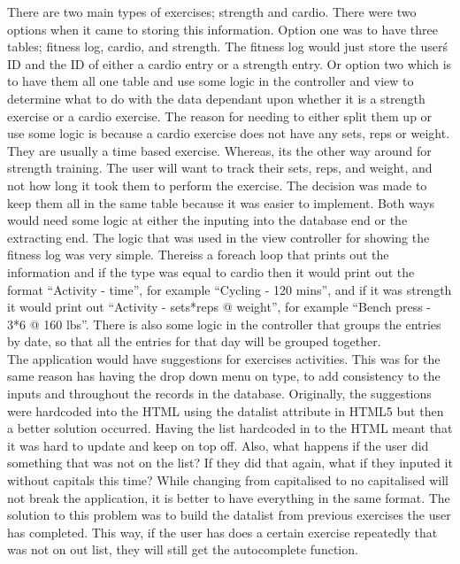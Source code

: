 There are two main types of exercises; strength and cardio. There were two options when it came to storing this information. Option one was to have three tables; fitness log, cardio, and strength. The fitness log would just store the user\'s ID and the ID of either a cardio entry or a strength entry. Or option two which is to have them all one table and use some logic in the controller and view to determine what to do with the data dependant upon whether it is a strength exercise or a cardio exercise. The reason for needing to either split them up or use some logic is because a cardio exercise does not have any sets, reps or weight. They are usually a time based exercise. Whereas, its the other way around for strength training. The user will want to track their sets, reps, and weight, and not how long it took them to perform the exercise. The decision was made to keep them all in the same table because it was easier to implement. Both ways would need some logic at either the inputing into the database end or the extracting end. The logic that was used in the view controller for showing the fitness log was very simple. Thereiss a foreach loop that prints out the information and if the type was equal to cardio then it would print out the format ``Activity - time'', for example ``Cycling - 120 mins'', and if it was strength it would print out ``Activity - sets*reps @ weight'', for example ``Bench press - 3*6 @ 160 lbs''. There is also some logic in the controller that groups the entries by date, so that all the entries for that day will be grouped together.\\

The application would have suggestions for exercises activities. This was for the same reason has having the drop down menu on type, to add consistency to the inputs and throughout the records in the database. Originally, the suggestions were hardcoded into the HTML using the datalist attribute in HTML5 but then a better solution occurred. Having the list hardcoded in to the HTML meant that it was hard to update and keep on top off. Also, what happens if the user did something that was not on the list? If they did that again, what if they inputed it without capitals this time? While changing from capitalised to no capitalised will not break the application, it is better to have everything in the same format. The solution to this problem was to build the datalist from previous exercises the user has completed. This way, if the user has does a certain exercise repeatedly that was not on out list, they will still get the autocomplete function.\\

